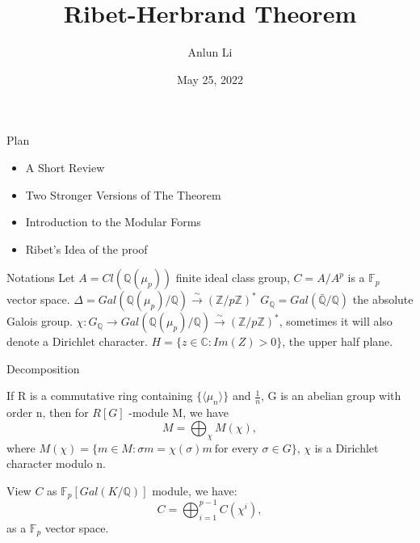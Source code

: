 \documentclass{beamer}
\title{Ribet-Herbrand Theorem}
\author{Anlun Li}
\institute{USTC}
\date{May 25, 2022}
\theoremstyle{plain}
\newtheorem{proposition}{Proposition}[section]
\theoremstyle{definition}
\theoremstyle{remark}
\newcommand{\Q}{\mathbb{Q}}
\newcommand{\Z}{\mathbb{Z}}
\newcommand{\F}{\mathbb{F}}
\begin{document}
\begin{frame}
    \titlepage
\end{frame}

\begin{frame}{Plan}
    \begin{itemize}
        \item A Short Review
        \item Two Stronger Versions of The Theorem
        \item Introduction to the Modular Forms
        \item Ribet's Idea of the proof
    \end{itemize}
\end{frame}


\begin{frame}{Notations}
    Let  $A=Cl(\Q(\mu_p))$ finite ideal class group, $C=A/A^p$ is a $\F_p$ vector space.
    \vskip 0.2cm
    $ \Delta=Gal(\Q(\mu_p)/\Q) \stackrel{\sim}{\longrightarrow} (\Z/p\Z)^*$
    \vskip 0.2cm
    $G_{\Q}=Gal(\bar{\Q}/\Q)$ the absolute Galois group.
    \vskip 0.2cm
    $\chi: G_{\Q} \to Gal(\Q(\mu_p)/\Q) \stackrel{\sim}{\longrightarrow} (\Z/p\Z)^*$, sometimes it will also denote a Dirichlet character.
    \vskip 0.2cm
    $H=\{z\in \mathbb{C}:Im(Z)>0\}$, the upper half plane.

\end{frame}
\iffalse
\begin{frame}{Kummer's Result}
    Kummer proved that:
    \begin{proposition}[Kummer]
        $p \mid h_K \ \iff \exists$ positive even integer r, such that
        $p \mid \zeta(1-r)$
    \end{proposition}
    We may be interested in a more explicite description.
\end{frame}
\fi
\begin{frame}{Decomposition}
    \begin{lemma}
        If R is a commutative ring containing $\{ \langle \mu_n \rangle \}$ and $\frac{1}{n}$,
        G is an abelian group with order n, then for $R[G]$ -module M, we have
        \[ M= \bigoplus_{\chi}M(\chi), \]
        where $M(\chi)=\{m\in M: \sigma m =\chi(\sigma) m \ \text{for every } \sigma \in G\} $, $\chi$
        is a Dirichlet character modulo n.
    \end{lemma}\pause
    View $C$ as $\mathbb{F}_p[Gal(K/\Q)]$ module, we have:
    \[ C=\bigoplus_{i=1}^{p-1} C(\chi^{i}), \]
    as a $\mathbb{F}_p$ vector space.

\end{frame}
\end{document}
